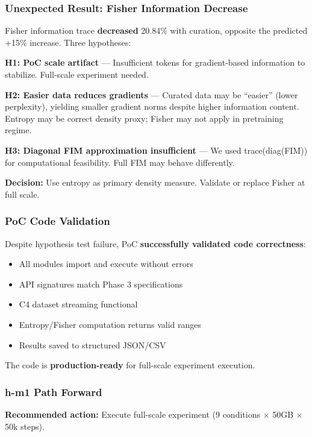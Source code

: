 \subsubsection{Unexpected Result: Fisher Information Decrease}

Fisher information trace \textbf{decreased} 20.84\% with curation, opposite the predicted +15\% increase. Three hypotheses:

\textbf{H1: PoC scale artifact} --- Insufficient tokens for gradient-based information to stabilize. Full-scale experiment needed.

\textbf{H2: Easier data reduces gradients} --- Curated data may be ``easier'' (lower perplexity), yielding smaller gradient norms despite higher information content. Entropy may be correct density proxy; Fisher may not apply in pretraining regime.

\textbf{H3: Diagonal FIM approximation insufficient} --- We used trace(diag(FIM)) for computational feasibility. Full FIM may behave differently.

\textbf{Decision:} Use entropy as primary density measure. Validate or replace Fisher at full scale.

\subsubsection{PoC Code Validation}

Despite hypothesis test failure, PoC \textbf{successfully validated code correctness}:
\begin{itemize}
\item \checkmark{} All modules import and execute without errors
\item \checkmark{} API signatures match Phase 3 specifications
\item \checkmark{} C4 dataset streaming functional
\item \checkmark{} Entropy/Fisher computation returns valid ranges
\item \checkmark{} Results saved to structured JSON/CSV
\end{itemize}

The code is \textbf{production-ready} for full-scale experiment execution.

\subsubsection{h-m1 Path Forward}

\textbf{Recommended action:} Execute full-scale experiment (9 conditions $\times$ 50GB $\times$ 50k steps).

